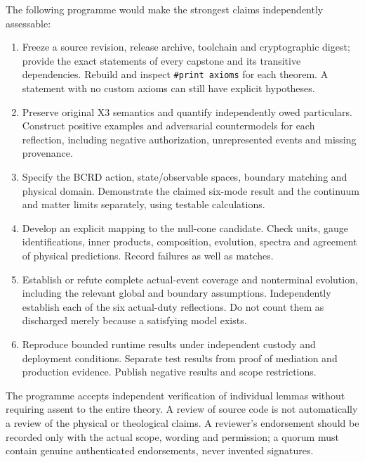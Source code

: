 \documentclass[11pt,a4paper]{article}
\begin{document}
The following programme would make the strongest claims independently assessable:
\begin{enumerate}[leftmargin=*]
\item Freeze a source revision, release archive, toolchain and cryptographic digest; provide the exact statements of every capstone and its transitive dependencies. Rebuild and inspect \texttt{\#print axioms} for each theorem. A statement with no custom axioms can still have explicit hypotheses.
\item Preserve original X3 semantics and quantify independently owed particulars. Construct positive examples and adversarial countermodels for each reflection, including negative authorization, unrepresented events and missing provenance.
\item Specify the BCRD action, state/observable spaces, boundary matching and physical domain. Demonstrate the claimed six-mode result and the continuum and matter limits separately, using testable calculations.
\item Develop an explicit mapping to the null-cone candidate. Check units, gauge identifications, inner products, composition, evolution, spectra and agreement of physical predictions. Record failures as well as matches.
\item Establish or refute complete actual-event coverage and nonterminal evolution, including the relevant global and boundary assumptions. Independently establish each of the six actual-duty reflections. Do not count them as discharged merely because a satisfying model exists.
\item Reproduce bounded runtime results under independent custody and deployment conditions. Separate test results from proof of mediation and production evidence. Publish negative results and scope restrictions.
\end{enumerate}
The programme accepts independent verification of individual lemmas without requiring assent to the entire theory. A review of source code is not automatically a review of the physical or theological claims. A reviewer's endorsement should be recorded only with the actual scope, wording and permission; a quorum must contain genuine authenticated endorsements, never invented signatures.
\end{document}
